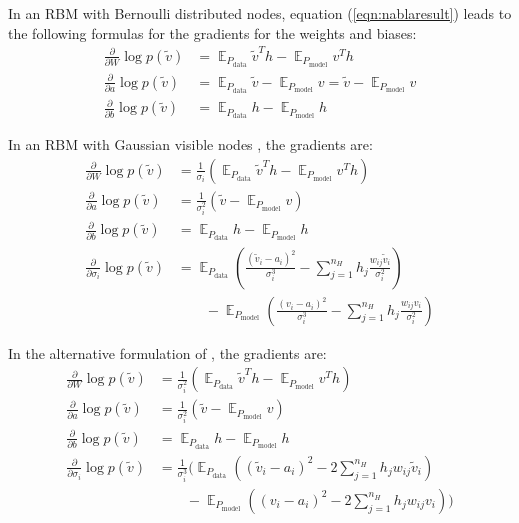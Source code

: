 \documentclass[12pt]{article}
\DeclareMathOperator{\EX}{\mathbb{E}}
\begin{document}
In an RBM with Bernoulli distributed nodes, equation (\ref{eqn:nablaresult}) leads to the following formulas for the gradients for the weights and biases:
\begin{align*}
\frac{\partial}{\partial W}  \log p(\widetilde{v}) &= \EX_{P_\text{data}}  \widetilde{v}^T h - \EX_{P_\text{model}} v^T h \\
\frac{\partial}{\partial a}  \log p(\widetilde{v}) &=  \EX_{P_\text{data}} 
\widetilde{v} - \EX_{P_\text{model}}  v = \widetilde{v} - \EX_{P_\text{model}} v\\
\frac{\partial}{\partial b}  \log p(\widetilde{v}) &=  \EX_{P_\text{data}} h - \EX_{P_\text{model}} h 
\end{align*}

In an RBM with Gaussian visible nodes \citep{krizhevsky2009tinyimagesthesis}, the  gradients are:
\begin{align*}
\frac{\partial}{\partial W} \log p(\widetilde{v}) &= \frac{1}{\sigma_i} \left ( \EX_{P_\text{data}} \widetilde{v}^T h - \EX_{P_\text{model}} v^T h \right) \\
\frac{\partial}{\partial a} \log p(\widetilde{v}) &= \frac{1}{\sigma_i^2} \left(\widetilde{v} - \EX_{P_\text{model}} v \right)\\
\frac{\partial}{\partial b} \log p(\widetilde{v}) &= \EX_{P_\text{data}} h - \EX_{P_\text{model}} h \\
\frac{\partial}{\partial \sigma_{i}} \log p(\widetilde{v}) &= \EX_{P_\text{data}} \left( \frac{(\widetilde{v}_i - a_i)^2}{\sigma_i^3} - \sum_{j=1}^{n_H} h_j \frac{w_{ij} \widetilde{v}_i}{\sigma_i^2}\right) \\ & \quad \quad - \EX_{P_\text{model}} \left(\frac{(v_i - a_i)^2}{\sigma_i^3} -\sum_{j=1}^{n_H} h_j \frac{w_{ij} v_i}{\sigma_i^2} \right)
\end{align*}

In the alternative formulation of \cite{cho2011improved}, the gradients are:
\begin{align*}
\frac{\partial}{\partial W} \log p(\widetilde{v}) &= \frac{1}{\sigma_i^2} \left ( \EX_{P_\text{data}} \widetilde{v}^T h - \EX_{P_\text{model}} v^T h \right) \\
\frac{\partial}{\partial a} \log p(\widetilde{v}) &= \frac{1}{\sigma_i^2} \left(\widetilde{v} - \EX_{P_\text{model}} v \right)\\
\frac{\partial}{\partial b} \log p(\widetilde{v}) &= \EX_{P_\text{data}} h - \EX_{P_\text{model}} h \\
\frac{\partial}{\partial \sigma_{i}} \log p(\widetilde{v}) &=  \frac{1}{\sigma_i^3} \Bigg( \EX_{P_\text{data}} \left( (\widetilde{v}_i - a_i)^2 - 2\sum_{j=1}^{n_H} h_j w_{ij} \widetilde{v}_i  \right) \\ & \quad \quad - \EX_{P_\text{model}} \left((v_i - a_i)^2 -2\sum_{j=1}^{n_H} h_j w_{ij} v_i \right) \Bigg)
\end{align*}
\end{document}
